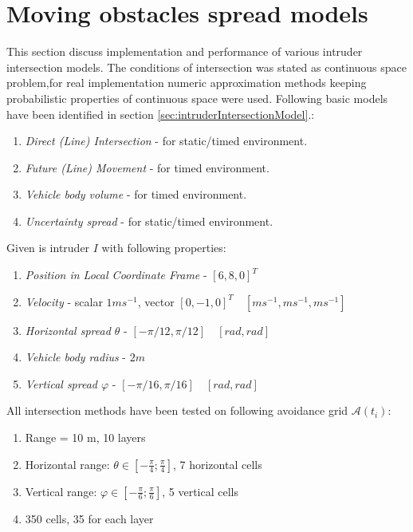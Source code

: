 \section{Moving obstacles spread models}
\noindent This section discuss implementation and performance of various intruder intersection models. The conditions of intersection was stated as continuous space problem,for real implementation numeric approximation methods keeping probabilistic properties of continuous space were used. 
\noindent Following basic models have been identified in section \ref{sec:intruderIntersectionModel}.:
\begin{enumerate}
    \item \textit{Direct (Line) Intersection} - for static/timed environment.
    \item \textit{Future (Line) Movement} -  for timed environment.
    \item \textit{Vehicle body volume} -  for timed environment.
    \item \textit{Uncertainty spread} -  for static/timed environment.
\end{enumerate}
\noindent Given is intruder $I$ with following properties:
\begin{enumerate}
    \item\textit{Position in Local Coordinate Frame} -  $[6,8,0]^T$
    \item\textit{Velocity} - scalar $1ms^{-1}$, vector $[0,-1,0]^T \quad [ms^{-1},ms^{-1},ms^{-1}]$
    \item\textit{Horizontal spread $\theta$} - $[-\pi/12,\pi/12]\quad [rad,rad]$
    \item\textit{Vehicle body radius} - $2 m$
    \item\textit{Vertical spread $\varphi$} - $[-\pi/16,\pi/16]\quad [rad,rad]$
\end{enumerate}

\noindent All intersection methods have been tested on following avoidance grid $\mathscr{A}(t_i)$:
\begin{enumerate}
    \item Range = 10 m, 10 layers
    \item Horizontal range: $\theta\in[-\frac{\pi}{4};\frac{\pi}{4}]$, 7 horizontal cells
    \item Vertical range: $\varphi\in[-\frac{\pi}{6};\frac{\pi}{6}]$, 5 vertical cells
    \item 350 cells, 35 for each layer
\end{enumerate}

